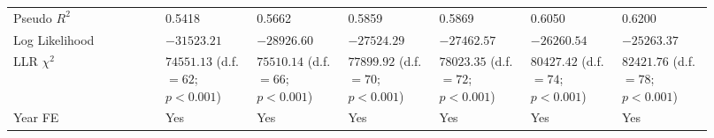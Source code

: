 {\begin{longtable}{p{0.2\linewidth}p{0.12\linewidth}p{0.12\linewidth}p{0.12\linewidth}p{0.12\linewidth}p{0.12\linewidth}p{0.12\linewidth}}
Pseudo $R^2$ & 0.5418 & 0.5662 & 0.5859 & 0.5869 & 0.6050 & 0.6200 \\ 
Log Likelihood & $-31523.21$ & $-28926.60$ & $-27524.29$ & $-27462.57$ & $-26260.54$ & $-25263.37$ \\ 
LLR $\chi^2$  & $74551.13$ (d.f. $= 62$; ${p < 0.001}$) & $75510.14$ (d.f. $= 66$; ${p < 0.001}$) & $77899.92$ (d.f. $= 70$; ${p < 0.001}$) & $78023.35$ (d.f. $= 72$; ${p < 0.001}$) & $80427.42$ (d.f. $= 74$; ${p < 0.001}$) & $82421.76$ (d.f. $= 78$; ${p < 0.001}$) \\ 
Year FE  & Yes & Yes & Yes & Yes & Yes & Yes \\ 
\hline 
\end{longtable} } 
